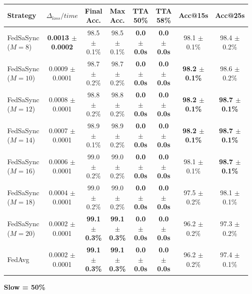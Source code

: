\begin{table}[t]
{\begin{tabular}{lccccccc}
\hline
Strategy & $\Delta_{loss}/time$ & Final Acc. & Max Acc. & TTA 50\% & TTA 58\% & Acc@15s & Acc@25s \\
\hline
FedSaSync ($M = 8$) & \textbf{0.0013 $\pm$ 0.0002} & 98.5 $\pm$ 0.1\% & 98.5 $\pm$ 0.1\% & \textbf{0.0 $\pm$ 0.0s} & \textbf{0.0 $\pm$ 0.0s} & 98.1 $\pm$ 0.1\% & 98.4 $\pm$ 0.2\% \\
FedSaSync ($M = 10$) & 0.0009 $\pm$ 0.0001 & 98.7 $\pm$ 0.2\% & 98.7 $\pm$ 0.2\% & \textbf{0.0 $\pm$ 0.0s} & \textbf{0.0 $\pm$ 0.0s} & \textbf{98.2 $\pm$ 0.1\%} & 98.6 $\pm$ 0.2\% \\
FedSaSync ($M = 12$) & 0.0008 $\pm$ 0.0001 & 98.8 $\pm$ 0.2\% & 98.8 $\pm$ 0.2\% & \textbf{0.0 $\pm$ 0.0s} & \textbf{0.0 $\pm$ 0.0s} & \textbf{98.2 $\pm$ 0.1\%} & \textbf{98.7 $\pm$ 0.1\%} \\
FedSaSync ($M = 14$) & 0.0007 $\pm$ 0.0001 & 98.9 $\pm$ 0.1\% & 98.9 $\pm$ 0.2\% & \textbf{0.0 $\pm$ 0.0s} & \textbf{0.0 $\pm$ 0.0s} & \textbf{98.2 $\pm$ 0.1\%} & \textbf{98.7 $\pm$ 0.1\%} \\
FedSaSync ($M = 16$) & 0.0006 $\pm$ 0.0001 & 99.0 $\pm$ 0.2\% & 99.0 $\pm$ 0.2\% & \textbf{0.0 $\pm$ 0.0s} & \textbf{0.0 $\pm$ 0.0s} & 98.1 $\pm$ 0.1\% & \textbf{98.7 $\pm$ 0.1\%} \\
FedSaSync ($M = 18$) & 0.0004 $\pm$ 0.0001 & 99.0 $\pm$ 0.2\% & 99.0 $\pm$ 0.2\% & \textbf{0.0 $\pm$ 0.0s} & \textbf{0.0 $\pm$ 0.0s} & 97.5 $\pm$ 0.2\% & 98.1 $\pm$ 0.1\% \\
FedSaSync ($M = 20$) & 0.0002 $\pm$ 0.0001 & \textbf{99.1 $\pm$ 0.3\%} & \textbf{99.1 $\pm$ 0.3\%} & \textbf{0.0 $\pm$ 0.0s} & \textbf{0.0 $\pm$ 0.0s} & 96.2 $\pm$ 0.2\% & 97.3 $\pm$ 0.2\% \\
FedAvg & 0.0002 $\pm$ 0.0001 & \textbf{99.1 $\pm$ 0.3\%} & \textbf{99.1 $\pm$ 0.3\%} & \textbf{0.0 $\pm$ 0.0s} & \textbf{0.0 $\pm$ 0.0s} & 96.2 $\pm$ 0.2\% & 97.4 $\pm$ 0.1\% \\
\hline
\end{tabular}%
}
\par\vspace{0.8em}
\noindent\textbf{Slow = 50\%} \\[0.2em]
\end{table}
